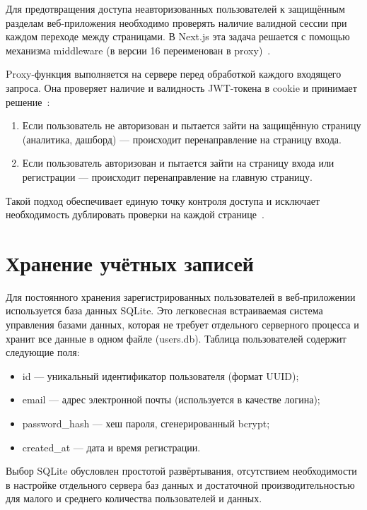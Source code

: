 Для предотвращения доступа неавторизованных пользователей к защищённым разделам веб-приложения необходимо проверять наличие валидной сессии при каждом переходе между страницами. В Next.js эта задача решается с помощью механизма middleware (в версии 16 переименован в proxy)~\cite{nextjsMiddleware}.

Proxy-функция выполняется на сервере перед обработкой каждого входящего запроса. Она проверяет наличие и валидность JWT-токена в cookie и принимает решение~\cite{nextjsMiddleware}:
\begin{enumerate}
    \item Если пользователь не авторизован и пытается зайти на защищённую страницу (аналитика, дашборд) — происходит перенаправление на страницу входа.
    \item Если пользователь авторизован и пытается зайти на страницу входа или регистрации — происходит перенаправление на главную страницу.
\end{enumerate}

Такой подход обеспечивает единую точку контроля доступа и исключает необходимость дублировать проверки на каждой странице~\cite{bookNextjs}.



\section{Хранение учётных записей}

Для постоянного хранения зарегистрированных пользователей в веб-приложении используется база данных SQLite. Это легковесная встраиваемая система управления базами данных, которая не требует отдельного серверного процесса и хранит все данные в одном файле (users.db). Таблица пользователей содержит следующие поля:
\begin{itemize}
\item id — уникальный идентификатор пользователя (формат UUID);
\item email — адрес электронной почты (используется в качестве логина);
\item password\_hash — хеш пароля, сгенерированный bcrypt;
\item created\_at — дата и время регистрации.
\end{itemize}

Выбор SQLite обусловлен простотой развёртывания, отсутствием необходимости в настройке отдельного сервера баз данных и достаточной производительностью для малого и среднего количества пользователей и данных.

